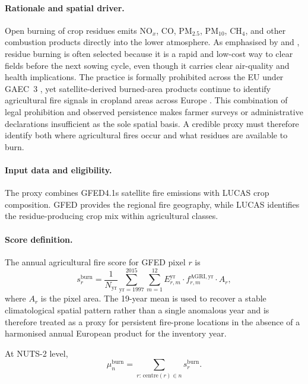 \paragraph{Rationale and spatial driver.}
Open burning of crop residues emits NO$_x$, CO, PM$_{2.5}$, PM$_{10}$,
CH$_4$, and other combustion products directly into the lower
atmosphere. As emphasised by \citet{pinakana2024} and
\citet{andreae_2019}, residue burning is often selected because it is a
rapid and low-cost way to clear fields before the next sowing cycle,
even though it carries clear air-quality and health implications. The
practice is formally prohibited across the EU under GAEC~3
\citep{eu_reg_2021_2115}, yet satellite-derived burned-area products
continue to identify agricultural fire signals in cropland areas across
Europe \citep{forrest_2024}. This combination of legal prohibition and
observed persistence makes farmer surveys or administrative declarations
insufficient as the sole spatial basis. A credible proxy must therefore
identify both where agricultural fires occur and what residues are
available to burn.

\paragraph{Input data and eligibility.}
The proxy combines GFED4.1s satellite fire emissions with LUCAS crop
composition. GFED provides the regional fire geography, while LUCAS
identifies the residue-producing crop mix within agricultural classes.

\paragraph{Score definition.}
The annual agricultural fire score for GFED pixel $r$ is
\begin{equation}
  s_r^{\mathrm{burn}} =
  \frac{1}{N_{\mathrm{yr}}}
  \sum_{\mathrm{yr}=1997}^{2015}
  \sum_{m=1}^{12}
  E_{r,m}^{\mathrm{yr}} \cdot f_{r,m}^{\mathrm{AGRI,yr}} \cdot A_r,
  \label{eq:gfed-score}
\end{equation}
where $A_r$ is the pixel area. The 19-year mean is used to recover a
stable climatological spatial pattern rather than a single anomalous
year and is therefore treated as a proxy for persistent fire-prone
locations in the absence of a harmonised annual European product for
the inventory year.

At NUTS-2 level,
\begin{equation}
  \mu_n^{\mathrm{burn}} =
  \sum_{r:\,\mathrm{centre}(r)\in n} s_r^{\mathrm{burn}}.
  \label{eq:nuts2-burn}
\end{equation}

